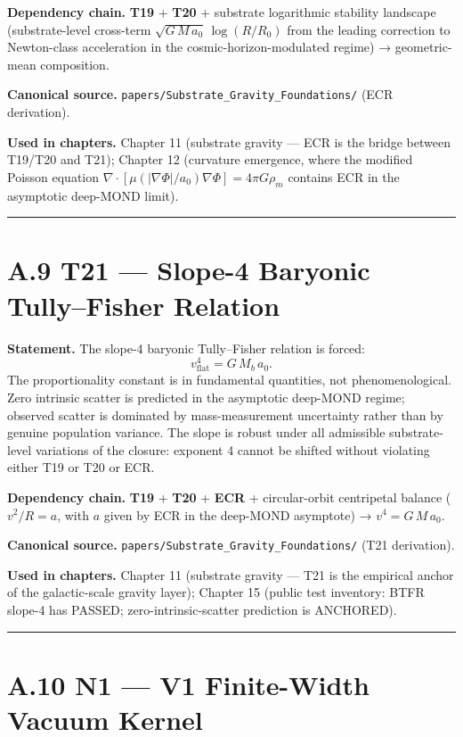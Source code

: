 \documentclass[11pt]{book}
\begin{document}
\textbf{Dependency chain.} \textbf{T19} + \textbf{T20} + substrate logarithmic stability landscape (substrate-level cross-term $\sqrt{G\,M\,a_0}\,\log(R/R_0)$ from the leading correction to Newton-class acceleration in the cosmic-horizon-modulated regime) → geometric-mean composition.

\textbf{Canonical source.} \texttt{papers/Substrate\_Gravity\_Foundations/} (ECR derivation).

\textbf{Used in chapters.} Chapter 11 (substrate gravity — ECR is the bridge between T19/T20 and T21); Chapter 12 (curvature emergence, where the modified Poisson equation $\nabla\cdot[\mu(|\nabla\Phi|/a_0)\nabla\Phi] = 4\pi G\rho_m$ contains ECR in the asymptotic deep-MOND limit).

\bigskip\hrule\bigskip

\section{A.9 T21 — Slope-4 Baryonic Tully–Fisher Relation}

\textbf{Statement.} The slope-4 baryonic Tully–Fisher relation is forced:
\[
v_\mathrm{flat}^4 = G\,M_b\,a_0.
\]
The proportionality constant is in fundamental quantities, not phenomenological. Zero intrinsic scatter is predicted in the asymptotic deep-MOND regime; observed scatter is dominated by mass-measurement uncertainty rather than by genuine population variance. The slope is robust under all admissible substrate-level variations of the closure: exponent 4 cannot be shifted without violating either T19 or T20 or ECR.

\textbf{Dependency chain.} \textbf{T19} + \textbf{T20} + \textbf{ECR} + circular-orbit centripetal balance ($v^2/R = a$, with $a$ given by ECR in the deep-MOND asymptote) → $v^4 = G\,M\,a_0$.

\textbf{Canonical source.} \texttt{papers/Substrate\_Gravity\_Foundations/} (T21 derivation).

\textbf{Used in chapters.} Chapter 11 (substrate gravity — T21 is the empirical anchor of the galactic-scale gravity layer); Chapter 15 (public test inventory: BTFR slope-4 has PASSED; zero-intrinsic-scatter prediction is ANCHORED).

\bigskip\hrule\bigskip

\section{A.10 N1 — V1 Finite-Width Vacuum Kernel}
\end{document}
